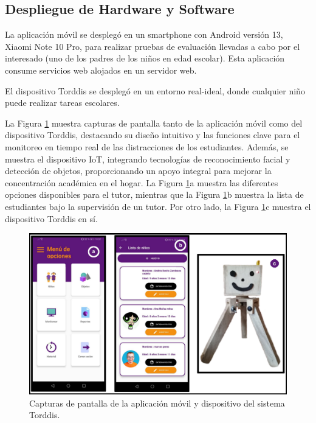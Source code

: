 \documentclass[a4paper,fleqn]{cas-sc}
\begin{document}
	\subsection{Despliegue de Hardware y Software}
	La aplicación móvil se desplegó en un smartphone con Android versión 13, Xiaomi Note 10 Pro, para realizar pruebas de evaluación llevadas a cabo por el interesado (uno de los padres de los niños en edad escolar). Esta aplicación consume servicios web alojados en un servidor web.
	
	El dispositivo Torddis se desplegó en un entorno real-ideal, donde cualquier niño puede realizar tareas escolares.
	
	La Figura \ref{fig:Torddis} muestra capturas de pantalla tanto de la aplicación móvil como del dispositivo Torddis, destacando su diseño intuitivo y las funciones clave para el monitoreo en tiempo real de las distracciones de los estudiantes. Además, se muestra el dispositivo IoT, integrando tecnologías de reconocimiento facial y detección de objetos, proporcionando un apoyo integral para mejorar la concentración académica en el hogar. La Figura \ref{fig:Torddis}a muestra las diferentes opciones disponibles para el tutor, mientras que la Figura \ref{fig:Torddis}b muestra la lista de estudiantes bajo la supervisión de un tutor. Por otro lado, la Figura \ref{fig:Torddis}c muestra el dispositivo Torddis en sí.
	
	\begin{figure}[hbt!]
		\centering
		\includegraphics[width=\linewidth]{figs/Figure_9}
		\caption{Capturas de pantalla de la aplicación móvil y dispositivo del sistema Torddis.\label{fig:Torddis}} 
	\end{figure}
	
\end{document}
